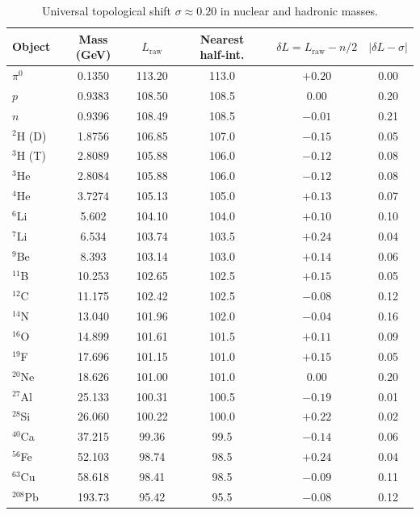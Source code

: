 \documentclass[12pt,a4paper]{article}
\begin{document}
\begin{table}[htbp]
	\centering
	\caption{Universal topological shift \(\sigma \approx 0.20\) in nuclear and hadronic masses.}
	\label{tab:nuclear_sigma}
	\small
	\begin{tabular}{l c c c c c}
		\toprule
		Object & Mass (GeV) & \(L_{\mathrm{raw}}\) & Nearest half‑int. & \(\delta L = L_{\mathrm{raw}} - n/2\) & \(|\delta L - \sigma|\) \\
		\midrule
		\(\pi^0\) & 0.1350 & 113.20 & 113.0 & \(+0.20\) & 0.00 \\
		\(p\)     & 0.9383 & 108.50 & 108.5 & \(0.00\)  & 0.20 \\
		\(n\)     & 0.9396 & 108.49 & 108.5 & \(-0.01\) & 0.21 \\
		\(^2\)H (D) & 1.8756 & 106.85 & 107.0 & \(-0.15\) & 0.05 \\
		\(^3\)H (T) & 2.8089 & 105.88 & 106.0 & \(-0.12\) & 0.08 \\
		\(^3\)He & 2.8084 & 105.88 & 106.0 & \(-0.12\) & 0.08 \\
		\(^4\)He & 3.7274 & 105.13 & 105.0 & \(+0.13\) & 0.07 \\
		\(^6\)Li & 5.602  & 104.10 & 104.0 & \(+0.10\) & 0.10 \\
		\(^7\)Li & 6.534  & 103.74 & 103.5 & \(+0.24\) & 0.04 \\
		\(^9\)Be & 8.393  & 103.14 & 103.0 & \(+0.14\) & 0.06 \\
		\(^{11}\)B & 10.253 & 102.65 & 102.5 & \(+0.15\) & 0.05 \\
		\(^{12}\)C & 11.175 & 102.42 & 102.5 & \(-0.08\) & 0.12 \\
		\(^{14}\)N & 13.040 & 101.96 & 102.0 & \(-0.04\) & 0.16 \\
		\(^{16}\)O & 14.899 & 101.61 & 101.5 & \(+0.11\) & 0.09 \\
		\(^{19}\)F & 17.696 & 101.15 & 101.0 & \(+0.15\) & 0.05 \\
		\(^{20}\)Ne & 18.626 & 101.00 & 101.0 & \(0.00\)  & 0.20 \\
		\(^{27}\)Al & 25.133 & 100.31 & 100.5 & \(-0.19\) & 0.01 \\
		\(^{28}\)Si & 26.060 & 100.22 & 100.0 & \(+0.22\) & 0.02 \\
		\(^{40}\)Ca & 37.215 & 99.36  & 99.5  & \(-0.14\) & 0.06 \\
		\(^{56}\)Fe & 52.103 & 98.74  & 98.5  & \(+0.24\) & 0.04 \\
		\(^{63}\)Cu & 58.618 & 98.41  & 98.5  & \(-0.09\) & 0.11 \\
		\(^{208}\)Pb & 193.73 & 95.42  & 95.5  & \(-0.08\) & 0.12 \\

\end{tabular}
\end{table}
\end{document}
